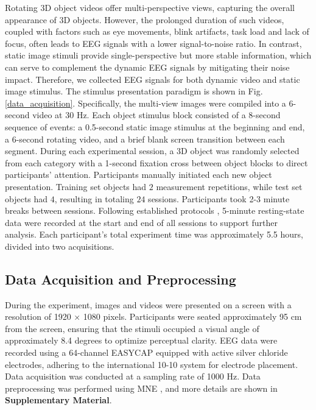 Rotating 3D object videos offer multi-perspective views, capturing the overall appearance of 3D objects. However, the prolonged duration of such videos, coupled with factors such as eye movements, blink artifacts, task load and lack of focus, often leads to EEG signals with a lower signal-to-noise ratio. In contrast, static image stimuli provide single-perspective but more stable information, which can serve to complement the dynamic EEG signals by mitigating their noise impact. Therefore, we collected EEG signals for both dynamic video and static image stimulus. The stimulus presentation paradigm is shown in Fig. \ref{data_acquisition}.
Specifically, the multi-view images were compiled into a 6-second video at 30 Hz. Each object stimulus block consisted of a 8-second sequence of events: a 0.5-second static image stimulus at the beginning and end, a 6-second rotating video, and a brief blank screen transition between each segment. 
During each experimental session, a 3D object was randomly selected from each category with a 1-second fixation cross between object blocks to direct participants' attention. Participants manually initiated each new object presentation. 
Training set objects had $2$ measurement repetitions, while test set objects had $4$, resulting in totaling $24$ sessions. 
Participants took 2-3 minute breaks between sessions.
Following established protocols \cite{gifford2022large}, 5-minute resting-state data were recorded at the start and end of all sessions to support further analysis. Each participant's total experiment time was approximately 5.5 hours, divided into two acquisitions.
\vspace{-0.3cm}
\subsection{Data Acquisition and Preprocessing}
\vspace{-0.1cm}
During the experiment, images and videos were presented on a screen with a resolution of 1920 × 1080 pixels. Participants were seated approximately 95 cm from the screen, ensuring that the stimuli occupied a visual angle of approximately 8.4 degrees to optimize perceptual clarity. EEG data were recorded using a 64-channel EASYCAP equipped with active silver chloride electrodes, adhering to the international 10-10 system for electrode placement. Data acquisition was conducted at a sampling rate of 1000 Hz. 
Data preprocessing was performed using MNE \cite{gramfort2013meg}, and more details are shown in \textbf{Supplementary Material}.

